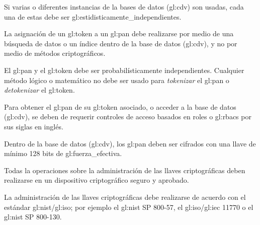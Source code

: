 {
  Si varias o diferentes instancias de la bases de datos (\gls{gl:cdv}) son
  usadas, cada una de estas debe ser \glspl{gl:estidisticamente_independiente}.
}

{
  La asignación de un \gls{gl:token} a un \gls{gl:pan} debe realizarse
  por medio de una búsqueda de datos o un índice dentro de la base de
  datos (\gls{gl:cdv}), y no por medio de métodos criptográficos.

  {
    El \gls{gl:pan} y el \gls{gl:token} debe ser probabilísticamente
    independientes. Cualquier método lógico o matemático no debe ser
    usado para \textit{tokenizar} el \gls{gl:pan} o \textit{detokenizar}
    el \gls{gl:token}.
  }
}

{
  Para obtener el \gls{gl:pan} de su \gls{gl:token} asociado, o acceder
  a la base de datos (\gls{gl:cdv}), se deben de requerir controles de
  acceso basados en roles o \gls{gl:rbacs} por sus siglas en inglés.
}

{
  Dentro de la base de datos (\gls{gl:cdv}), los \gls{gl:pan} deben ser
  cifrados con una llave de mínimo 128 bits de \gls{gl:fuerza_efectiva}.
}

{
  Todas la operaciones sobre la administración de las llaves criptográficas
  deben realizarse en un dispositivo criptográfico seguro y aprobado.
}

{
  La administración de las llaves criptográficas debe realizarse de
  acuerdo con el estándar \gls{gl:nist}/\acrshort{gl:iso}; por ejemplo
  el \gls{gl:nist} SP 800-57, el \acrshort{gl:iso}/\acrshort{gl:iec}
  11770 o el \gls{gl:nist} SP 800-130.
}

